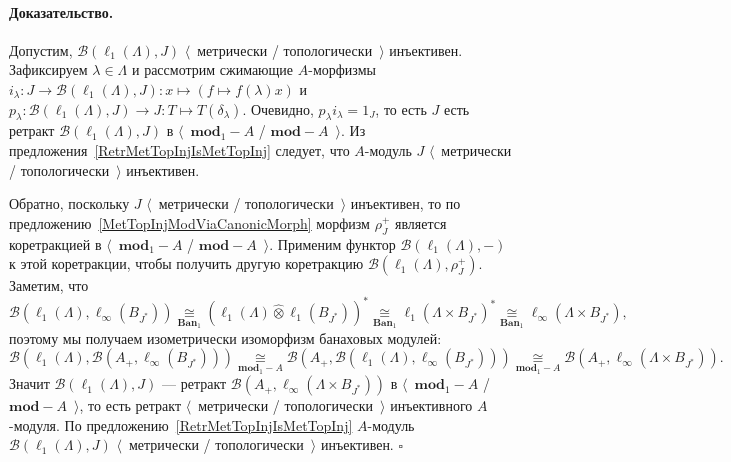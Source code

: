 \documentclass[12pt]{article}
\newcommand{\projtens}{\mathbin{\widehat{\otimes}}}
\newcommand{\isom}[1]{\mathop{\mathbin{\cong}}\limits_{#1}}
\renewenvironment{proof}{\paragraph{Доказательство.}}{\hfill$\square$\medskip}
\begin{document}
\begin{proof}
    Допустим, $\mathcal{B}(\ell_1(\Lambda), J)$  $\langle$~метрически /
    топологически~$\rangle$ инъективен. Зафиксируем $\lambda\in\Lambda$ и
    рассмотрим сжимающие $A$-морфизмы
    $i_\lambda:J\to\mathcal{B}(\ell_1(\Lambda),J):x\mapsto(f\mapsto
        f(\lambda)x)$ и $p_\lambda:\mathcal{B}(\ell_1(\Lambda),J)\to J:T\mapsto
        T(\delta_\lambda)$. Очевидно, $p_\lambda i_\lambda=1_J$, то есть $J$ есть
    ретракт $\mathcal{B}(\ell_1(\Lambda),J)$ в $\langle$~$\mathbf{mod}_1-A$ /
    $\mathbf{mod}-A$~$\rangle$. Из предложения~\ref{RetrMetTopInjIsMetTopInj}
    следует, что $A$-модуль $J$ $\langle$~метрически / топологически~$\rangle$
    инъективен.

    Обратно, поскольку $J$ $\langle$~метрически / топологически~$\rangle$
    инъективен, то по предложению~\ref{MetTopInjModViaCanonicMorph} морфизм
    $\rho_J^+$ является коретракцией в $\langle$~$\mathbf{mod}_1-A$ /
    $\mathbf{mod}-A$~$\rangle$. Применим функтор
    $\mathcal{B}(\ell_1(\Lambda),-)$ к этой коретракции, чтобы получить другую
    коретракцию $\mathcal{B}(\ell_1(\Lambda),\rho_J^+)$. Заметим, что
    $$
        \mathcal{B}(\ell_1(\Lambda),\ell_\infty(B_{J^*}))
        \isom{\mathbf{Ban}_1}
        {(\ell_1(\Lambda)\projtens \ell_1(B_{J^*}))}^*
        \isom{\mathbf{Ban}_1}
        {\ell_1(\Lambda\times B_{J^*})}^*
        \isom{\mathbf{Ban}_1}
        \ell_\infty(\Lambda\times B_{J^*}),
    $$
    поэтому мы получаем изометрически изоморфизм банаховых модулей:
    $$
        \mathcal{B}(\ell_1(\Lambda),\mathcal{B}(A_+,\ell_\infty(B_{J^*})))
        \isom{\mathbf{mod}_1-A}
        \mathcal{B}(A_+,\mathcal{B}(\ell_1(\Lambda),\ell_\infty(B_{J^*})))
        \isom{\mathbf{mod}_1-A}
        \mathcal{B}(A_+,\ell_\infty(\Lambda\times B_{J^*})).
    $$
    Значит $\mathcal{B}(\ell_1(\Lambda),J)$ --- ретракт
    $\mathcal{B}(A_+,\ell_\infty(\Lambda\times B_{J^*}))$ в
    $\langle$~$\mathbf{mod}_1-A$ / $\mathbf{mod}-A$~$\rangle$, то есть ретракт
    $\langle$~метрически / топологически~$\rangle$ инъективного $A$-модуля. По
    предложению~\ref{RetrMetTopInjIsMetTopInj} $A$-модуль
    $\mathcal{B}(\ell_1(\Lambda), J)$ $\langle$~метрически /
    топологически~$\rangle$ инъективен.
\end{proof}

\end{document}
